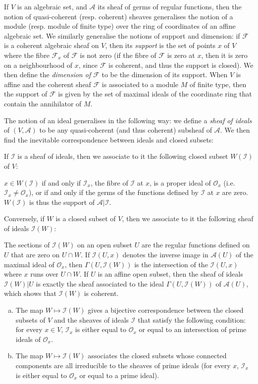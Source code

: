\documentclass{article}
\theoremstyle{plain}
\newenvironment{proposition}[1]
    {\renewcommand\theinnercustomproposition{#1}\innercustomproposition}
    {\endinnercustomproposition}
\newcommand{\sh}{\mathscr}
\newcommand{\oldpage}[1]{\marginpar{\footnotesize$\Big\vert$ \textit{p.~#1}}}
\begin{document}
If $V$ is an algebraic set, and $\sh{A}$ its sheaf of germs of regular functions, then the notion of quasi-coherent (resp. coherent) sheaves generalises the notion of a module (resp. module of finite type) over the ring of coordinates of an affine algebraic set.
We similarly generalise the notions of support and dimension: if $\sh{F}$ is a coherent algebraic sheaf on $V$, then its \emph{support} is the set of points $x$ of $V$ where the fibre $\sh{F}_x$ of $\sh{F}$ is not zero (if the fibre of $\sh{F}$ is zero at $x$, then it is zero on a neighbourhood of $x$, since $\sh{F}$ is coherent, and thus the support is closed).
We then define the \emph{dimension of $\sh{F}$} to be the dimension of its support.
When $V$ is affine and the coherent sheaf $\sh{F}$ is associated to a module $M$ of finite type, then the support of $\sh{F}$ is given by the set of maximal ideals of the coordinate ring that contain the annihilator of $M$.

The notion of an ideal generalises in the following way: we define a \emph{sheaf of ideals} of $(V,\sh{A})$ to be any quasi-coherent (and thus coherent) subsheaf of $\sh{A}$.
We then find the inevitable correspondence between ideals and closed subsets:

If $\sh{I}$ is a sheaf of ideals, then we associate to it the following closed subset $W(\sh{I})$ of $V$:

$x\in W(\sh{I})$ if and only if $\sh{I}_x$, the fibre of $\sh{I}$ at $x$, is a proper ideal of $\sh{O}_x$ (i.e. $\sh{I}_x\neq\sh{O}_x$), or if and only if the germs of the functions defined by $\sh{I}$ at $x$ are zero.
$W(\sh{I})$ is thus the support of $\sh{A}|\sh{I}$.

Conversely, if $W$ is a closed subset of $V$, then we associate to it the following sheaf of ideals $\sh{I}(W)$:

The sections of $\sh{I}(W)$ on an open subset $U$ are the regular functions defined on $U$ that are zero on $U\cap W$.
If $\sh{I}(U,x)$ denotes the inverse image in $\sh{A}(U)$ of the maximal ideal of $\sh{O}_x$, then $\Gamma(U,\sh{I}(W))$ is the intersection
\oldpage{2-03}
of the $\sh{I}(U,x)$ where $x$ runs over $U\cap W$.
If $U$ is an affine open subset, then the sheaf of ideals $\sh{I}(W)|U$ is exactly the sheaf associated to the ideal $\Gamma(U,\sh{I}(W))$ of $\sh{A}(U)$, which shows that $\sh{I}(W)$ is coherent.

\begin{proposition}{1}
\label{proposition1}
  \begin{enumerate}[(a)]
    \item The map $W\mapsto\sh{I}(W)$ gives a bijective correspondence between the closed subsets of $V$ and the sheaves of ideals $\sh{I}$ that satisfy the following condition:
      for every $x\in V$, $\sh{I}_x$ is either equal to $\sh{O}_x$ or equal to an intersection of prime ideals of $\sh{O}_x$.
    \item The map $W\mapsto\sh{I}(W)$ associates the closed subsets whose connected components are all irreducible to the sheaves of prime ideals (for every $x$, $\sh{I}_x$ is either equal to $\sh{O}_x$ or equal to a prime ideal).
  \end{enumerate}
\end{proposition}
\end{document}
